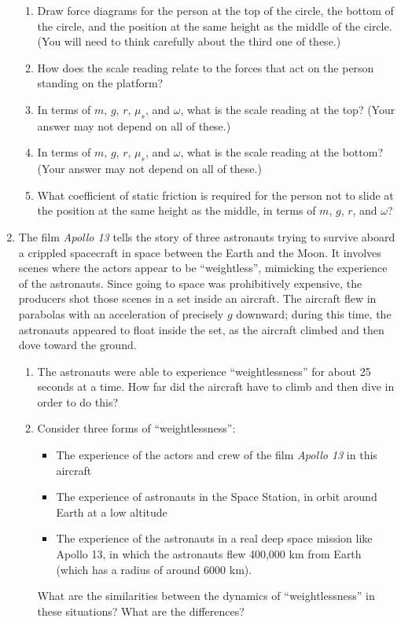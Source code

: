 \documentclass[12pt]{article}
\begin{document}
\begin{enumerate}
\begin{enumerate}
\item Draw force diagrams for the person at the top of the circle, the bottom of the circle, and the position at the 
same height as the middle of the circle. (You will need to think carefully about the third one of these.)
\item How does the scale reading relate to the forces that act on the person standing on the platform?
\item In terms of $m$, $g$, $r$, $\mu_s$, and $\omega$, what is the scale reading at the top? (Your answer may not depend on all of these.)
\item In terms of $m$, $g$, $r$, $\mu_s$, and $\omega$, what is the scale reading at the bottom? (Your answer may not depend on all of these.)
\item What coefficient of static friction is required for the person not to slide at the position at the same height as the middle, in terms of $m$, $g$, $r$, and $\omega$?
\end{enumerate}

\item The film {\it Apollo 13} tells the story of three astronauts trying to survive aboard a crippled spacecraft in
space between the Earth and the Moon. It involves scenes where the actors appear to be ``weightless'', mimicking 
the experience of the astronauts. Since going to space was prohibitively expensive, the producers shot those scenes
in a set inside an aircraft. The aircraft flew in parabolas with an acceleration of precisely $g$ downward; during this time,
the astronauts appeared to float inside the set, as the aircraft climbed and then dove toward the ground.

\begin{enumerate}
\item The astronauts were able to experience ``weightlessness'' for about 25 seconds at a time. How far did the aircraft have
to climb and then dive in order to do this?
\item Consider three forms of ``weightlessness'':
\begin{itemize}
\item The experience of the actors and crew of the film {\it Apollo 13} in this aircraft
\item The experience of astronauts in the Space Station, in orbit around Earth at a low altitude
\item The experience of the astronauts in a real deep space mission like Apollo 13, in which the astronauts flew
400,000 km from Earth (which has a radius of around 6000 km). 
\end{itemize}
What are the similarities between the dynamics of ``weightlessness'' in these situations? What are the differences? 


\end{enumerate}
\end{enumerate}
\end{document}

